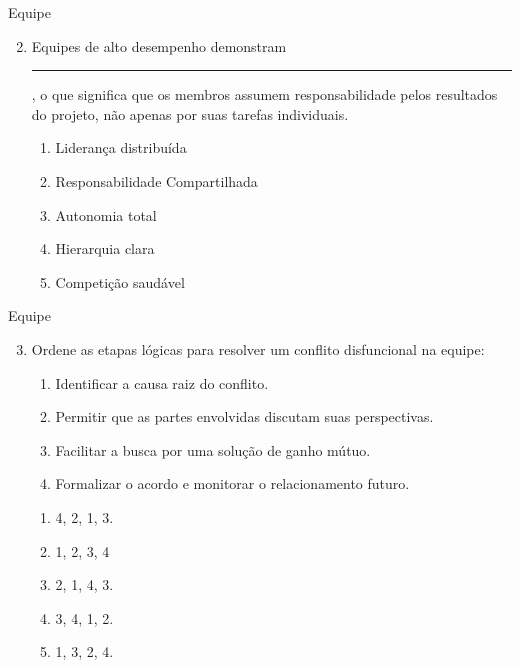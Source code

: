 \documentclass{beamer}
\begin{document}
\begin{frame}{Equipe}
	\begin{enumerate}
		\setcounter{enumi}{1}
		\justifying
		\item Equipes de alto desempenho demonstram \rule{80pt}{1pt}, o que significa que os membros assumem responsabilidade pelos resultados do projeto, não apenas por suas tarefas individuais.
		\begin{enumerate}[a]
			\item Liderança distribuída
			\item \alert<2>{Responsabilidade Compartilhada}
			\item Autonomia total
			\item Hierarquia clara
			\item Competição saudável
		\end{enumerate}
	\end{enumerate}
\end{frame}

\begin{frame}{Equipe}
	\begin{enumerate}
		\setcounter{enumi}{2}
		\justifying
		\item Ordene as etapas lógicas para resolver um conflito disfuncional na equipe:
		\begin{enumerate}[I]
			\item Identificar a causa raiz do conflito.
			\item Permitir que as partes envolvidas discutam suas perspectivas.
			\item Facilitar a busca por uma solução de ganho mútuo.
			\item Formalizar o acordo e monitorar o relacionamento futuro.
		\end{enumerate}
		\begin{enumerate}[a]
			\item 4, 2, 1, 3.
			\item \alert<2>{1, 2, 3, 4}
			\item 2, 1, 4, 3.
			\item 3, 4, 1, 2.
			\item 1, 3, 2, 4.
		\end{enumerate}
	\end{enumerate}
\end{frame}
\end{document}
